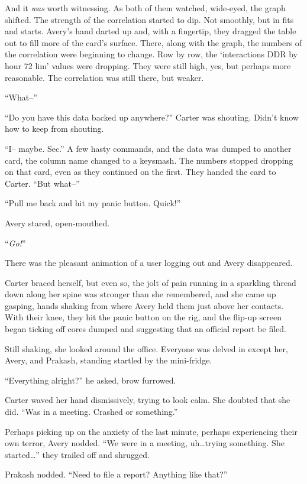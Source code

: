 And it \emph{was} worth witnessing. As both of them watched, wide-eyed, the graph shifted. The strength of the correlation started to dip. Not smoothly, but in fits and starts. Avery's hand darted up and, with a fingertip, they dragged the table out to fill more of the card's surface. There, along with the graph, the numbers of the correlation were beginning to change. Row by row, the `interactions DDR by hour 72 lim' values were dropping. They were still high, yes, but perhaps more reasonable. The correlation was still there, but weaker.

``What--''

``Do you have this data backed up anywhere?'' Carter was shouting. Didn't know how to keep from shouting.

``I-- maybe. Sec.'' A few hasty commands, and the data was dumped to another card, the column name changed to a keysmash. The numbers stopped dropping on that card, even as they continued on the first. They handed the card to Carter. ``But what--''

``Pull me back and hit my panic button. Quick!''

Avery stared, open-mouthed.

``\emph{Go!}''

There was the pleasant animation of a user logging out and Avery disappeared.

Carter braced herself, but even so, the jolt of pain running in a sparkling thread down along her spine was stronger than she remembered, and she came up gasping, hands shaking from where Avery held them just above her contacts. With their knee, they hit the panic button on the rig, and the flip-up screen began ticking off cores dumped and suggesting that an official report be filed.

Still shaking, she looked around the office. Everyone was delved in except her, Avery, and Prakash, standing startled by the mini-fridge.

``Everything alright?'' he asked, brow furrowed.

Carter waved her hand dismissively, trying to look calm. She doubted that she did. ``Was in a meeting. Crashed or something.''

Perhaps picking up on the anxiety of the last minute, perhaps experiencing their own terror, Avery nodded. ``We were in a meeting, uh\ldots{}trying something. She started\ldots{}'' they trailed off and shrugged.

Prakash nodded. ``Need to file a report? Anything like that?''

